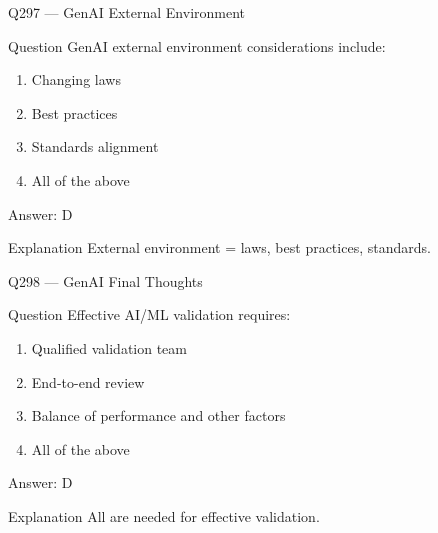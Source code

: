 \documentclass[aspectratio=169,8pt]{beamer}
\begin{document}
										\begin{frame}{Q297 --- GenAI External Environment}
											\begin{block}{Question}
												GenAI external environment considerations include:
												\begin{enumerate}
													\item Changing laws
													\item Best practices
													\item Standards alignment
													\item All of the above
												\end{enumerate}
											\end{block}
											\begin{exampleblock}{Answer: D}\end{exampleblock}
											\begin{block}{Explanation}
												External environment = laws, best practices, standards.
											\end{block}
										\end{frame}
										
										\begin{frame}{Q298 --- GenAI Final Thoughts}
											\begin{block}{Question}
												Effective AI/ML validation requires:
												\begin{enumerate}
													\item Qualified validation team
													\item End-to-end review
													\item Balance of performance and other factors
													\item All of the above
												\end{enumerate}
											\end{block}
											\begin{exampleblock}{Answer: D}\end{exampleblock}
											\begin{block}{Explanation}
												All are needed for effective validation.
											\end{block}
										\end{frame}
										
\end{document}
